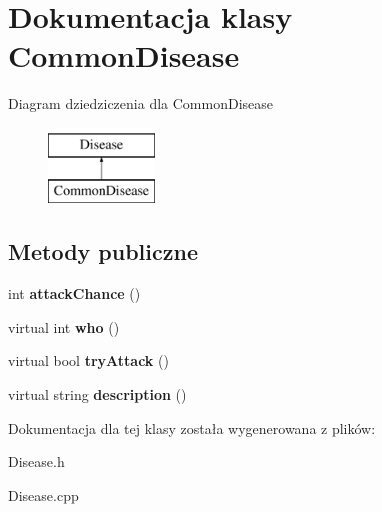 \hypertarget{classCommonDisease}{}\section{Dokumentacja klasy Common\+Disease}
\label{classCommonDisease}
Diagram dziedziczenia dla Common\+Disease\begin{figure}[H]
\begin{center}
\leavevmode
\includegraphics[height=2.000000cm]{classCommonDisease}
\end{center}
\end{figure}
\subsection*{Metody publiczne}
\begin{DoxyCompactItemize}
\item 
int {\bfseries attack\+Chance} ()\hypertarget{classCommonDisease_aedc0c61d8adb52f672f7d8ad4fb92087}{}\label{classCommonDisease_aedc0c61d8adb52f672f7d8ad4fb92087}

\item 
virtual int {\bfseries who} ()\hypertarget{classCommonDisease_a740853d832994e8a5b64410049113fe6}{}\label{classCommonDisease_a740853d832994e8a5b64410049113fe6}

\item 
virtual bool {\bfseries try\+Attack} ()\hypertarget{classCommonDisease_a628842276e544539a55ab484a9bb7bce}{}\label{classCommonDisease_a628842276e544539a55ab484a9bb7bce}

\item 
virtual string {\bfseries description} ()\hypertarget{classCommonDisease_a1804255e2d381189f1dfa398c62001ec}{}\label{classCommonDisease_a1804255e2d381189f1dfa398c62001ec}

\end{DoxyCompactItemize}


Dokumentacja dla tej klasy została wygenerowana z plików\+:\begin{DoxyCompactItemize}
\item 
Disease.\+h\item 
Disease.\+cpp\end{DoxyCompactItemize}

